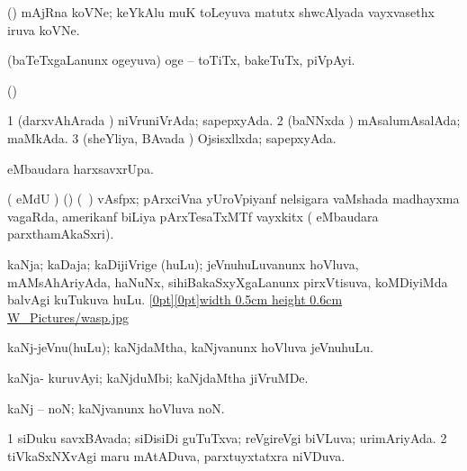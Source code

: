 {\bentry
{} 
\gl{\nA}
\expl{}
\bmng
(\ame) mAjRna koVNe; keYkAlu muK toLeyuva matutx shwcAlyada vayxvasethx iruva koVNe. 
\emng
\eentry

\bentry
{} 
\gl{\nA}
\expl{}
\bmng
{} 
\emng
\eentry

\bentry
{} 
\gl{\nA}
\expl{}
\bmng
(baTeTxgaLanunx ogeyuva) oge -- toTiTx, bakeTuTx, piVpAyi. 
\emng
\eentry

\bentry
{} 
\gl{\nA}
\expl{}
\bmng
(\ame)  
\emng
\eentry

\bentry
{} 
\gl{\gu}
\expl{}
\bmng
\bnum
\num{1} (darxvAhArada \vi) niVruniVrAda; sapepxyAda. 
\num{2} (baNNxda \vi) mAsalumAsalAda; maMkAda. 
\num{3} (sheYliya, BAvada \vi) Ojsisxllxda; sapepxyAda. 
\enum
\emng
\eentry

\bentry
{} 
\bmng
{} eMbaudara harxsavxrUpa. 
\emng
\eentry

\bentry
{} 
\gl{\nA}
\expl{}
\bmng
( eMdU \parx) (\ame) (\sA\ \hiV) vAsfpx; pArxciVna yUroVpiyanf nelsigara vaMshada madhayxma vagaRda, amerikanf biLiya pArxTesaTxMTf vayxkitx ( eMbaudara parxthamAkaSxri). 
\emng
\eentry

{} 
\gl{\nA}
\expl{}
\bmng
kaNja; kaDaja; kaDijiVrige (huLu); jeVnuhuLuvanunx hoVluva, mAMsAhAriyAda, haNuNx, sihiBakaSxyXgaLanunx pirxVtisuva, koMDiyiMda balvAgi kuTukuva huLu. \quad \hyperlink{waspfigure}{\raisebox{-0.15cm}[0pt][0pt]{\pdfimage width 0.5cm height 0.6cm {W_Pictures/wasp.jpg}}} 
\emng
\eentry

\bentry
{} 
\gl{\nA}
\expl{}
\bmng
kaNj-jeVnu(huLu); kaNjdaMtha, kaNjvanunx hoVluva jeVnuhuLu. 
\emng
\eentry

\bentry
{} 
\gl{\nA}
\expl{}
\bmng
kaNja- kuruvAyi; kaNjduMbi; kaNjdaMtha jiVruMDe. 
\emng
\eentry

\bentry
{} 
\gl{\nA}
\expl{}
\bmng
kaNj -- noN; kaNjvanunx hoVluva noN. 
\emng
\eentry

\bentry
{} 
\gl{\gu}
\expl{}
\bmng
\bnum
\num{1} siDuku savxBAvada; siDisiDi guTuTxva; reVgireVgi biVLuva; urimAriyAda. 
\num{2} tiVkaSxNXvAgi maru mAtADuva, parxtuyxtatxra niVDuva. 
\enum
\emng
\eentry

}

